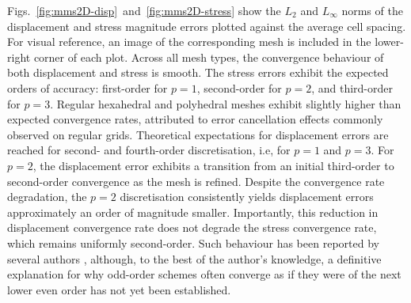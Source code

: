 \documentclass[review,3p]{elsarticle}
\begin{document}
Figs.~\ref{fig:mms2D-disp}~and~\ref{fig:mms2D-stress} show the $L_2$ and $L_\infty$ norms of the displacement and stress magnitude errors plotted against the average cell spacing. For visual reference, an image of the corresponding mesh is included in the lower-right corner of each plot. Across all mesh types, the convergence behaviour of both displacement and stress is smooth. The stress errors exhibit the expected orders of accuracy: first-order for $p=1$, second-order for $p=2$, and third-order for $p=3$. Regular hexahedral and polyhedral meshes exhibit slightly higher than expected convergence rates, attributed to error cancellation effects commonly observed on regular grids. 
Theoretical expectations for displacement errors are reached for second- and fourth-order discretisation, i.e, for $p=1$ and $p=3$. For 
$p=2$, the displacement error exhibits a transition from an initial third-order to second-order convergence as the mesh is refined. Despite the convergence rate degradation, the $p=2$ discretisation consistently yields displacement errors approximately an order of magnitude smaller. Importantly, this reduction in displacement convergence rate does not degrade the stress convergence rate, which remains uniformly second-order. Such behaviour has been reported by several authors \cite{Nishikawa2025a}, although, to the best of the author’s knowledge, a definitive explanation for why odd-order schemes often converge as if they were of the next lower even order has not yet been established.
\end{document}
